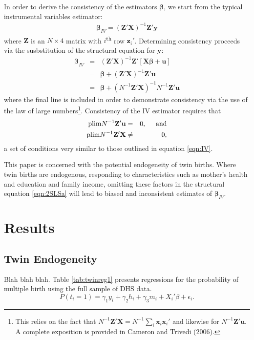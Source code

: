 \documentclass{article}[11pt,subeqn]
\newcommand{\vect}[1]{\mathbf{#1}}
\begin{document}
\begin{spacing}{1.25}
In order to derive the consistency of the estimators $\vect{\beta}$, we start from the typical instrumental variables estimator:
\begin{eqnarray}
\label{eqn:IVconsist}
\vect{\beta}_{IV}=(\vect{Z}'\vect{X})^{-1}\vect{Z}'\vect{y} \nonumber
\end{eqnarray}
where $\vect{Z}$ is an $N \times 4$ matrix with $i$\textsuperscript{th} row $\vect{z}_i'$.  Determining consistency proceeds via
the susbstitution of the structural equation for $\vect{y}$:
\begin{eqnarray}
\label{eqn:IVconsist2}
\vect{\beta}_{IV}&=&(\vect{Z}'\vect{X})^{-1}\vect{Z}'[\vect{X\beta}+\vect{u}] \nonumber\\
&=&\vect{\beta}+(\vect{Z}'\vect{X})^{-1}\vect{Z}'\vect{u}\nonumber\\
&=&\vect{\beta}+(N^{-1}\vect{Z}'\vect{X})^{-1}N^{-1}\vect{Z}'\vect{u}\nonumber
\end{eqnarray}
where the final line is included in order to demonstrate consistency via the use of the law of large numbers\footnote{This relies
on the fact that $N^{-1}\vect{Z}'\vect{X}=N^{-1}\sum_i\vect{x}_i\vect{x}_i'$ and likewise for $N^{-1}\vect{Z}'\vect{u}$.  A
complete exposition is provided in Cameron and Trivedi (2006).}.  Consistency of the IV estimator requires that
\begin{eqnarray}
\label{eqn:IVconsist3}
\mathrm{plim} N^{-1}\vect{Z'u}&=&0, \hspace{5mm}\mathrm{and} \\
\mathrm{plim} N^{-1}\vect{Z'X}&\neq&0,
\end{eqnarray}
a set of conditions very similar to those outlined in equation \ref{eqn:IV}.

This paper is concerned with the potential endogeneity of twin births.  Where twin births are endogenous, responding to
characteristics such as mother's health and education and family income, omitting these factors in the structural equation
\ref{eqn:2SLSa} will lead to biased and inconsistent estimates of $\vect{\beta}_{IV}$.

\section{Results}
\label{sec:results}
\subsection{Twin Endogeneity}
\label{sec:twinendog}
Blah blah blah.  Table \ref{tab:twinreg1} presents regressions for the probability of multiple birth using the full sample of DHS data.
\begin{equation}
\label{eqn:twinpred}
P(t_i=1)=\gamma_1 y_i + \gamma_2 h_i + \gamma_3 m_i +X_i'\beta + \epsilon_i.
\end{equation}


\end{spacing}
\end{document}
